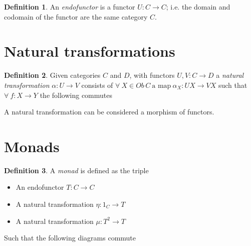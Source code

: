 \documentclass{article}
\theoremstyle{definition}
\newtheorem{definition}{Definition}[section]
\begin{document}
\begin{definition}
    An \textit{endofunctor} is a functor $U : C \rightarrow C$;
    i.e. the domain and codomain of the functor are the same category $C$.
\end{definition}

\section{Natural transformations}
\begin{definition}
    Given categories $C$ and $D$,
    with functors $U, V : C \rightarrow D$
    a \textit{natural transformation} $\alpha : U \rightarrow V$
    consists of
    $
    \forall\ X \in Ob\,C\ \textrm{a map}
    \ \alpha_X : UX \rightarrow VX
    $
    such that $\forall\ f : X \rightarrow Y$ the following commutes
    \begin{center}
    \end{center}
    A natural transformation can be considered a morphism of functors.
\end{definition}

\section{Monads}
\begin{definition}
    A \textit{monad} is defined as the triple
    \begin{itemize}
        \item An endofunctor $T : C \rightarrow C$
        \item A natural transformation $\eta : 1_{C} \rightarrow T$
        \item A natural transformation $\mu : T^2 \rightarrow T$
    \end{itemize}
    Such that the following diagrams commute
    \begin{center}
        \quad
    \end{center}
\end{definition}
\end{document}
